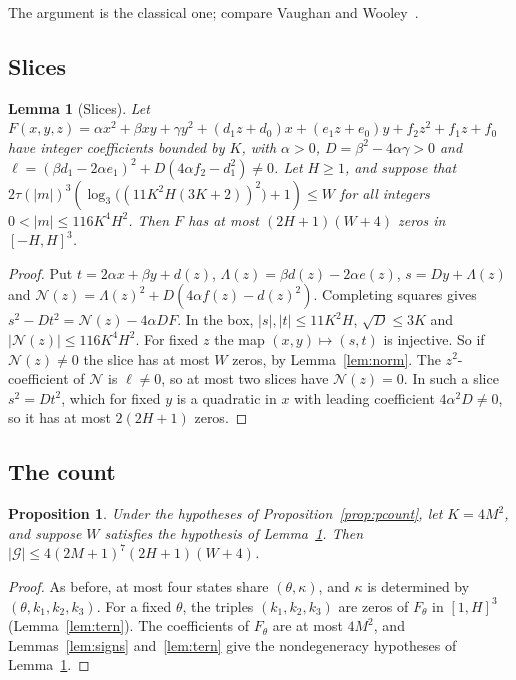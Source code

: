\documentclass[11pt]{amsart}
\newtheorem{lemma}[theorem]{Lemma}
\newtheorem{proposition}[theorem]{Proposition}
\theoremstyle{definition}
\theoremstyle{remark}
\begin{document}
The argument is the classical one; compare Vaughan and Wooley~\cite[Lemma~3.5]{VW}.

\subsection{Slices}

\begin{lemma}[Slices]\label{lem:slice}
Let $F(x,y,z)=\alpha x^2+\beta xy+\gamma y^2+(d_1z+d_0)x+(e_1z+e_0)y+f_2z^2+f_1z+f_0$ have integer
coefficients bounded by $K$, with $\alpha>0$, $D=\beta^2-4\alpha\gamma>0$ and
$\ell=(\beta d_1-2\alpha e_1)^2+D(4\alpha f_2-d_1^2)\ne0$. Let $H\ge1$, and suppose that
$2\tau(|m|)^3(\log_3\bigl((11K^2H(3K+2))^2\bigr)+1)\le W$ for all integers $0<|m|\le116K^4H^2$. Then $F$ has at most
$(2H+1)(W+4)$ zeros in $[-H,H]^3$.
\end{lemma}

\begin{proof}
Put $t=2\alpha x+\beta y+d(z)$, $\Lambda(z)=\beta d(z)-2\alpha e(z)$, $s=Dy+\Lambda(z)$ and
$\mathcal N(z)=\Lambda(z)^2+D(4\alpha f(z)-d(z)^2)$. Completing squares gives
$s^2-Dt^2=\mathcal N(z)-4\alpha DF$. In the box, $|s|,|t|\le11K^2H$,
$\sqrt D\le3K$ and $|\mathcal N(z)|\le116K^4H^2$. For fixed $z$ the map $(x,y)\mapsto(s,t)$
is injective. So if $\mathcal N(z)\ne0$ the slice has at most $W$ zeros, by
Lemma~\ref{lem:norm}. The $z^2$-coefficient of $\mathcal N$ is $\ell\ne0$, so at most two
slices have $\mathcal N(z)=0$. In such a slice $s^2=Dt^2$, which for fixed $y$ is a
quadratic in $x$ with leading coefficient $4\alpha^2D\ne0$, so it has at most
$2(2H+1)$ zeros.
\end{proof}

\subsection{The count}

\begin{proposition}\label{prop:pcount2}
Under the hypotheses of Proposition~\ref{prop:pcount}, let $K=4M^2$, and suppose $W$ satisfies
the hypothesis of Lemma~\ref{lem:slice}. Then $|\mathcal G|\le4(2M+1)^7(2H+1)(W+4)$.
\end{proposition}

\begin{proof}
As before, at most four states share $(\theta,\kappa)$, and $\kappa$ is determined by
$(\theta,k_1,k_2,k_3)$. For a fixed $\theta$, the triples $(k_1,k_2,k_3)$ are zeros of
$F_\theta$ in $[1,H]^3$ (Lemma~\ref{lem:tern}). The coefficients of $F_\theta$ are at most
$4M^2$, and Lemmas~\ref{lem:signs} and~\ref{lem:tern} give the nondegeneracy hypotheses of
Lemma~\ref{lem:slice}.
\end{proof}
\end{document}
